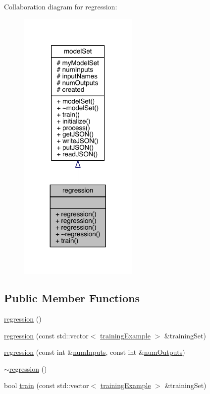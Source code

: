 Collaboration diagram for regression\+:
\nopagebreak
\begin{figure}[H]
\begin{center}
\leavevmode
\includegraphics[width=164pt]{classregression__coll__graph}
\end{center}
\end{figure}
\subsection*{Public Member Functions}
\begin{DoxyCompactItemize}
\item 
\hyperlink{classregression_a40993153659b1f637cf4d596df6e97ab}{regression} ()
\item 
\hyperlink{classregression_a029d23d2403773148373bb091d2734c2}{regression} (const std\+::vector$<$ \hyperlink{structtraining_example}{training\+Example} $>$ \&training\+Set)
\item 
\hyperlink{classregression_ae3474e3fbc7c31a80ad862dd18f7489d}{regression} (const int \&\hyperlink{classmodel_set_ad10fbc1228a85f1200cb89589ad92755}{num\+Inputs}, const int \&\hyperlink{classmodel_set_addc0df56b9f1970c9816050634933716}{num\+Outputs})
\item 
\hyperlink{classregression_abde9f6759b404a8fe6db7d2a96acda0c}{$\sim$regression} ()
\item 
bool \hyperlink{classregression_afb1956067fda0d20d2ed755086c9f592}{train} (const std\+::vector$<$ \hyperlink{structtraining_example}{training\+Example} $>$ \&training\+Set)
\end{DoxyCompactItemize}
